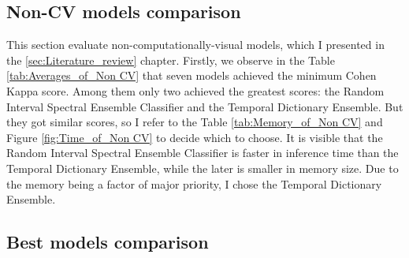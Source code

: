 




\FloatBarrier

\subsection{Non-CV models comparison}

This section evaluate non-computationally-visual models, which I presented in the \ref{sec:Literature_review} chapter. Firstly, we observe in the Table \ref{tab:Averages_of_Non CV} that seven models achieved the minimum Cohen Kappa score. Among them only two achieved the greatest scores: the Random Interval Spectral Ensemble Classifier and the Temporal Dictionary Ensemble. But they got similar scores, so I refer to the Table \ref{tab:Memory_of_Non CV} and Figure \ref{fig:Time_of_Non CV} to decide which to choose. It is visible that the Random Interval Spectral Ensemble Classifier is faster in inference time than the Temporal Dictionary Ensemble, while the later is smaller in memory size. Due to the memory being a factor of major priority, I chose the Temporal Dictionary Ensemble. 	 






\FloatBarrier

\subsection{Best models comparison}


